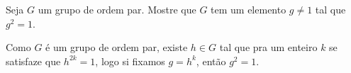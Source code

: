\begin{homeworkProblem}
  Seja $G$ um grupo de ordem par. Mostre que $G$ tem um elemento $g \neq 1$ tal que $g^2 = 1$.
  \begin{solution}
    Como $G$ é um grupo de ordem par, existe $h\in G$ tal que pra um enteiro $k$ se satisfaze que $h^{2k}=1$, logo si fixamos $g=h^{k}$, então $g^{2}=1$.  
  \end{solution}
\end{homeworkProblem}

